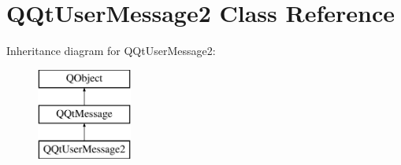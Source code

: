 \hypertarget{class_q_qt_user_message2}{}\section{Q\+Qt\+User\+Message2 Class Reference}
\label{class_q_qt_user_message2}
Inheritance diagram for Q\+Qt\+User\+Message2\+:\begin{figure}[H]
\begin{center}
\leavevmode
\includegraphics[height=3.000000cm]{class_q_qt_user_message2}
\end{center}
\end{figure}
